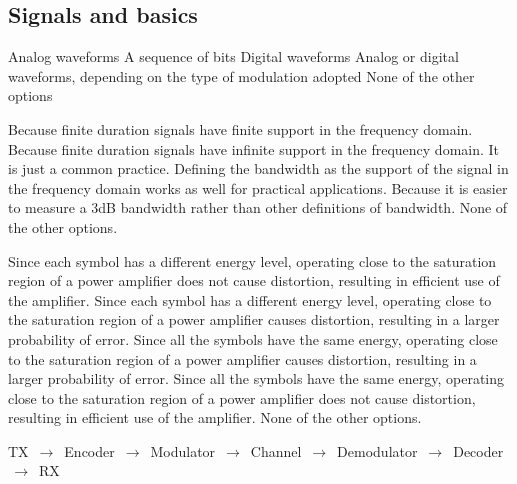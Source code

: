 \subsection{Signals and basics}

\begin{checkboxes}
    \CorrectChoice Analog waveforms
    \choice A sequence of bits
    \choice Digital waveforms
    \choice Analog or digital waveforms, depending on the type of modulation adopted
    \choice None of the other options
\end{checkboxes}

\begin{checkboxes}
    \choice Because finite duration signals have finite support in the frequency domain.
    \CorrectChoice Because finite duration signals have infinite support in the frequency domain.
    \choice It is just a common practice. Defining the bandwidth as the support of the signal in the frequency domain works as well for practical applications.
    \choice Because it is easier to measure a 3dB bandwidth rather than other definitions of bandwidth.
    \choice None of the other options.
\end{checkboxes}

\begin{checkboxes}
    \choice Since each symbol has a different energy level, operating close to the saturation region of a power amplifier does not cause distortion, resulting in efficient use of the amplifier.
    \choice Since each symbol has a different energy level, operating close to the saturation region of a power amplifier causes distortion, resulting in a larger probability of error.
    \choice Since all the symbols have the same energy, operating close to the saturation region of a power amplifier causes distortion, resulting in a larger probability of error.
    \CorrectChoice Since all the symbols have the same energy, operating close to the saturation region of a power amplifier does not cause distortion, resulting in efficient use of the amplifier.
    \choice None of the other options.
\end{checkboxes}

\begin{solution}
    TX $\,\to\,$ Encoder $\,\to\,$ Modulator  $\,\to\,$ Channel  $\,\to\,$ Demodulator  $\,\to\,$ Decoder  $\,\to\,$ RX
\end{solution}

